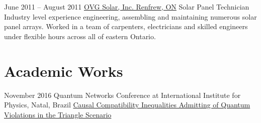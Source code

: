 \documentclass{article}
\begin{document}
\begin{experiencelist}
        \item{
            June 2011 -- August 2011
            }{
                \href{www.ovgsolarinc.ca}{OVG Solar, Inc. Renfrew, ON}
            }{
                Solar Panel Technician
            }{
                Industry level experience engineering, assembling and maintaining numerous solar panel arrays. Worked in a team of carpenters, electricians and skilled engineers under flexible hours across all of eastern Ontario.
            }
    \end{experiencelist}
    \vspace{-20pt}
    \section{Academic Works}
        {
            \begin{academiclist}
                \item{November 2016}
                {Quantum Networks Conference at International Institute for Physics, Natal, Brazil}
                {\href{https://github.com/tcfraser/tcfraser.github.io/raw/master/documents/quantum_networks_brazil_2016.pdf}{Causal Compatibility Inequalities Admitting of Quantum Violations in the Triangle Scenario}}
            \end{academiclist}
        }
\end{document}

